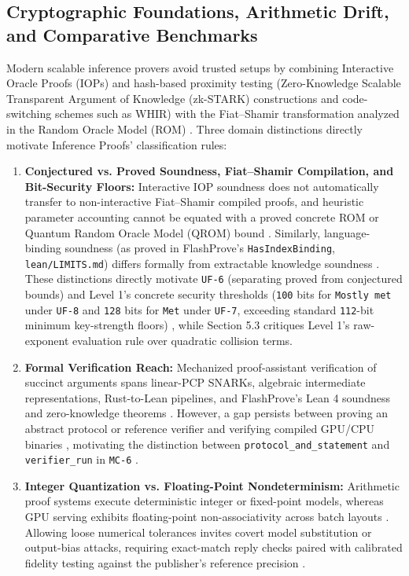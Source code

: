 \documentclass[11pt,letterpaper]{article}
\begin{document}
\subsection{Cryptographic Foundations, Arithmetic Drift, and Comparative Benchmarks}

Modern scalable inference provers avoid trusted setups by combining Interactive Oracle Proofs (IOPs) and hash-based proximity testing (Zero-Knowledge Scalable Transparent Argument of Knowledge (zk-STARK) constructions and code-switching schemes such as WHIR) with the Fiat--Shamir transformation analyzed in the Random Oracle Model (ROM) \cite{rinberg2026flashprove,sash2026}. Three domain distinctions directly motivate Inference Proofs' classification rules:

\begin{enumerate}
\item \textbf{Conjectured vs. Proved Soundness, Fiat--Shamir Compilation, and Bit-Security Floors:} Interactive IOP soundness does not automatically transfer to non-interactive Fiat--Shamir compiled proofs, and heuristic parameter accounting cannot be equated with a proved concrete ROM or Quantum Random Oracle Model (QROM) bound \cite{iproofs2026,rinberg2026flashprove}. Similarly, language-binding soundness (as proved in FlashProve's \texttt{HasIndexBinding}, \texttt{lean/\allowbreak{}LIMITS.\allowbreak{}md}) differs formally from extractable knowledge soundness \cite{rinberg2026flashprove}. These distinctions directly motivate \texttt{UF-6} (separating proved from conjectured bounds) and Level 1's concrete security thresholds (\texttt{100} bits for \texttt{Mostly met} under \texttt{UF-8} and \texttt{128} bits for \texttt{Met} under \texttt{UF-7}, exceeding standard \texttt{112}-bit minimum key-strength floors) \cite{iproofs2026}, while Section 5.3 critiques Level 1's raw-exponent evaluation rule over quadratic collision terms.
\item \textbf{Formal Verification Reach:} Mechanized proof-assistant verification of succinct arguments spans linear-PCP SNARKs, algebraic intermediate representations, Rust-to-Lean pipelines, and FlashProve's Lean 4 soundness and zero-knowledge theorems \cite{rinberg2026flashprove}. However, a gap persists between proving an abstract protocol or reference verifier and verifying compiled GPU/CPU binaries \cite{rinberg2026flashprove}, motivating the distinction between \texttt{protocol\_\allowbreak{}and\_\allowbreak{}statement} and \texttt{verifier\_\allowbreak{}run} in \texttt{MC-6} \cite{iproofs2026}.
\item \textbf{Integer Quantization vs. Floating-Point Nondeterminism:} Arithmetic proof systems execute deterministic integer or fixed-point models, whereas GPU serving exhibits floating-point non-associativity across batch layouts \cite{rinberg2026flashprove,iproofs2026}. Allowing loose numerical tolerances invites covert model substitution or output-bias attacks, requiring exact-match reply checks paired with calibrated fidelity testing against the publisher's reference precision \cite{iproofs2026}.
\end{enumerate}
\end{document}
